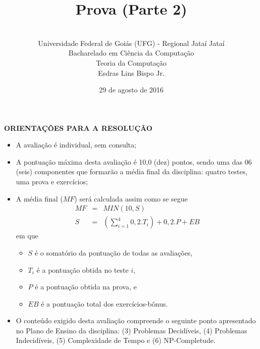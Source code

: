 \documentclass[12pt,a4paper,oneside]{article}
\author{\\Universidade Federal de Goiás (UFG) - Regional Jataí Jataí\\Bacharelado em Ciência da Computação \\Teoria da Computação \\Esdras Lins Bispo Jr.}
\date{29 de agosto de 2016}
\title{\sc \huge Prova (Parte 2)}
\begin{document}
\maketitle

{\bf ORIENTAÇÕES PARA A RESOLUÇÃO}
{ \footnotesize
\begin{itemize}
	\item A avaliação é individual, sem consulta;
	\item A pontuação máxima desta avaliação é 10,0 (dez) pontos, sendo uma das 06 (seis) componentes que formarão a média final da disciplina: quatro testes, uma prova e exercícios;
	\item A média final ($MF$) será calculada assim como se segue
	\begin{eqnarray}
		MF & = & MIN(10, S) \nonumber \\
		S & = & (\sum_{i=1}^{4} 0,2.T_i ) + 0,2.P  + EB \nonumber
	\end{eqnarray}
	em que 
	\begin{itemize}
		\item $S$ é o somatório da pontuação de todas as avaliações,
		\item $T_i$ é a pontuação obtida no teste $i$,
		\item $P$ é a pontuação obtida na prova, e
		\item $EB$ é a pontuação total dos exercícios-bônus.
	\end{itemize}
	\item O conteúdo exigido desta avaliação compreende o seguinte ponto apresentado no Plano de Ensino da disciplina:  (3) Problemas Decidíveis, (4) Problemas Indecidíveis, (5) Complexidade de Tempo e (6) NP-Completude.
\end{itemize}

\begin{center}
\end{center}
}
\newpage
\end{document}
